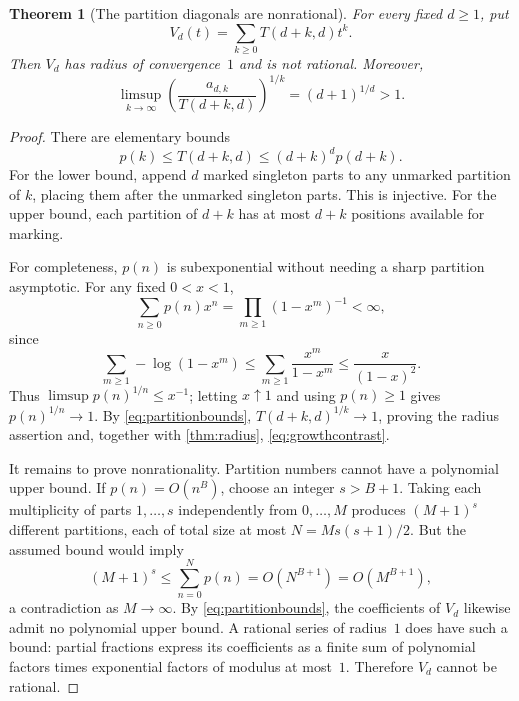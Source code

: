 \documentclass[11pt,letterpaper]{article}
\numberwithin{equation}{section}
\newtheorem{theorem}{Theorem}[section]
\theoremstyle{definition}
\theoremstyle{remark}
\begin{document}
\begin{theorem}[The partition diagonals are nonrational]\label{thm:partitioncontrast}
For every fixed $d\ge1$, put
\begin{equation}\label{eq:V}
 V_d(t)=\sum_{k\ge0}T(d+k,d)t^k.
\end{equation}
Then $V_d$ has radius of convergence~$1$ and is not rational. Moreover,
\begin{equation}\label{eq:growthcontrast}
 \limsup_{k\to\infty}
 \left(\frac{a_{d,k}}{T(d+k,d)}\right)^{1/k}=(d+1)^{1/d}>1.
\end{equation}
\end{theorem}
\begin{proof}
There are elementary bounds
\begin{equation}\label{eq:partitionbounds}
 p(k)\le T(d+k,d)\le(d+k)^d p(d+k).
\end{equation}
For the lower bound, append $d$ marked singleton parts to any unmarked
partition of $k$, placing them after the unmarked singleton parts.
This is injective. For the upper bound, each partition of $d+k$ has
at most $d+k$ positions available for marking.

For completeness, $p(n)$ is subexponential without needing a sharp
partition asymptotic. For any fixed $0<x<1$,
\[
 \sum_{n\ge0}p(n)x^n=\prod_{m\ge1}(1-x^m)^{-1}<\infty,
\]
since
\[
 \sum_{m\ge1}-\log(1-x^m)
 \le\sum_{m\ge1}\frac{x^m}{1-x^m}
 \le\frac{x}{(1-x)^2}.
\]
Thus $\limsup p(n)^{1/n}\le x^{-1}$; letting $x\uparrow1$ and using
$p(n)\ge1$ gives $p(n)^{1/n}\to1$. By \eqref{eq:partitionbounds},
$T(d+k,d)^{1/k}\to1$, proving the radius assertion and, together with
\cref{thm:radius}, \eqref{eq:growthcontrast}.

It remains to prove nonrationality. Partition numbers cannot have a
polynomial upper bound. If $p(n)=O(n^B)$, choose an integer $s>B+1$.
Taking each multiplicity of parts $1,\ldots,s$ independently from
$0,\ldots,M$ produces $(M+1)^s$ different partitions, each of total size
at most $N=Ms(s+1)/2$. But the assumed bound would imply
\[
 (M+1)^s\le\sum_{n=0}^{N}p(n)=O(N^{B+1})=O(M^{B+1}),
\]
a contradiction as $M\to\infty$.
By \eqref{eq:partitionbounds}, the coefficients of $V_d$ likewise admit
no polynomial upper bound. A rational series of radius~$1$ does have
such a bound: partial fractions express its coefficients as a finite
sum of polynomial factors times exponential factors of modulus at
most~$1$. Therefore $V_d$ cannot be rational.
\end{proof}
\end{document}
